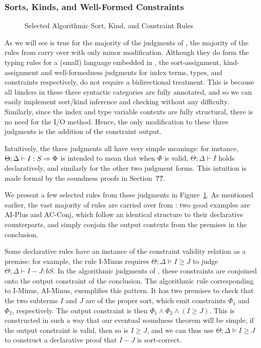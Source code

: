 \subsubsection{Sorts, Kinds, and Well-Formed Constraints}
\begin{figure}

\label{fig:bilambdaamor-selected-sort-kind-constr-rules}
\caption{Selected Algorithmic Sort, Kind, and Constraint Rules}
\end{figure}

As we will see is true for the majority of the judgments of \bilambdaamor, the majority of the rules from \dlambdaamor carry over with only minor modification. Although they do form the typing rules for a (small) language embedded in \bilambdaamor, the sort-assignment, kind-assignment and well-formedness judgments for index terms, types, and constraints respectively, do not require a bidirectional treatment. This is because all binders in these three syntactic categories are fully annotated, and so we can easily implement sort/kind inference and checking without any difficulty. Similarly, since the index and type variable contexts are fully structural, there is no need for the I/O method. Hence, the only modification to these three judgments is the addition of the constraint output.

Intuitively, the three judgments all have very simple meanings: for instance, $\Theta ; \Delta \vdash I : S \Rightarrow \Phi$ is intended to mean that when $\Phi$ is valid, $\Theta ; \Delta \vdash I$ holds declaratively, and similarly for the other two judgment forms. This intuition is made formal by the soundness proofs in Section~\textbf{??}.

We present a few selected rules from these judgments in Figure~\ref{fig:bilambdaamor-selected-sort-kind-constr-rules}. As mentioned earlier, the vast majority of rules are carried over from \dlambdaamor: two good examples are AI-Plus and AC-Conj, which follow an identical structure to their declarative counterparts, and simply conjoin the output contexts from the premises in the conclusion.

Some declarative rules have an instance of the constraint validity relation as a premise: for example, the rule I-Minus requires $\Theta ; \Delta \vDash I \geq J$ to judge $\Theta ; \Delta \vdash I - J : bS$. In the algorithmic judgments of \bilambdaamor, these constraints are conjoined onto the output constraint of the conclusion. The algorithmic rule corresponding to I-Minus, AI-Minus, exemplifies this pattern. It has two premises to check that the two subterms $I$ and $J$ are of the proper sort, which emit constraints $\Phi_1$ and $\Phi_2$, respectively. The output constraint is then $\Phi_1 \wedge \Phi_2 \wedge (I \geq J)$. This is constructed in such a way that our eventual soundness theorem will be simple, if the output constraint is valid, then so is $I \geq J$, and we can thus use $\Theta ; \Delta \vDash I \geq J$ to construct a declarative proof that $I - J$ is sort-correct.

